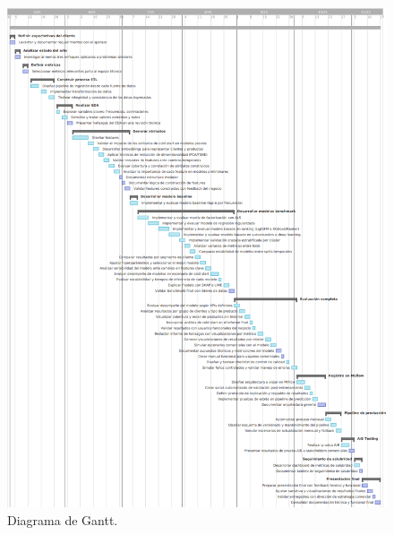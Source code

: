 \documentclass[
11pt, %
]{charter}
\begin{document}
\begin{figure}[htpb]
\centering 
\includegraphics[height=.95\textheight]{./Figuras/Gantt.png}
\caption{Diagrama de Gantt.} 
\label{fig:diagGantt}
\end{figure}
\end{document}
